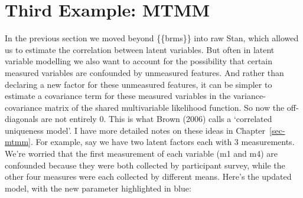 \documentclass[
  letterpaper,
  DIV=11,
  numbers=noendperiod]{scrreprt}
\begin{document}
\hypertarget{third-example-mtmm}{%
\section{Third Example: MTMM}\label{third-example-mtmm}}

In the previous section we moved beyond \{\{brms\}\} into raw Stan,
which allowed us to estimate the correlation between latent variables.
But often in latent variable modelling we also want to account for the
possibility that certain measured variables are confounded by unmeasured
features. And rather than declaring a new factor for these unmeasured
features, it can be simpler to estimate a covariance term for these
measured variables in the variance-covariance matrix of the shared
multivariable likelihood function. So now the off-diagonals are not
entirely 0. This is what Brown (2006) calls a `correlated uniqueness
model'. I have more detailed notes on these ideas in
Chapter~\ref{sec-mtmm}. For example, say we have two latent factors each
with 3 measurements. We're worried that the first measurement of each
variable (m1 and m4) are confounded because they were both collected by
participant survey, while the other four measures were each collected by
different means. Here's the updated model, with the new parameter
highlighted in blue:
\end{document}
